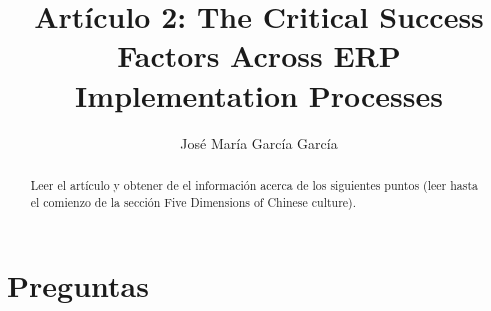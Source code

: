 \documentclass[11pt,a4paper]{article}
\author{José María García García}
\title{Artículo 2: The Critical Success Factors Across ERP Implementation Processes}
\begin{document}
\maketitle
\begin{abstract}
Leer el artículo y obtener de el información acerca de los siguientes puntos (leer hasta el comienzo de la sección Five Dimensions of Chinese culture).
\end{abstract}

\section{Preguntas}
\end{document}
